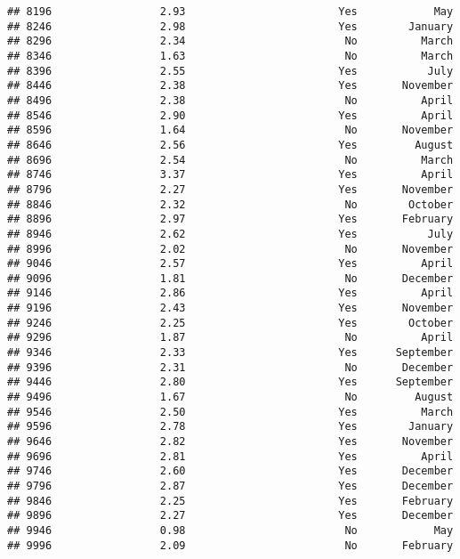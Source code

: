 \documentclass[
]{article}
\begin{document}
\begin{verbatim}
## 8196                 2.93                        Yes            May
## 8246                 2.98                        Yes        January
## 8296                 2.34                         No          March
## 8346                 1.63                         No          March
## 8396                 2.55                        Yes           July
## 8446                 2.38                        Yes       November
## 8496                 2.38                         No          April
## 8546                 2.90                        Yes          April
## 8596                 1.64                         No       November
## 8646                 2.56                        Yes         August
## 8696                 2.54                         No          March
## 8746                 3.37                        Yes          April
## 8796                 2.27                        Yes       November
## 8846                 2.32                         No        October
## 8896                 2.97                        Yes       February
## 8946                 2.62                        Yes           July
## 8996                 2.02                         No       November
## 9046                 2.57                        Yes          April
## 9096                 1.81                         No       December
## 9146                 2.86                        Yes          April
## 9196                 2.43                        Yes       November
## 9246                 2.25                        Yes        October
## 9296                 1.87                         No          April
## 9346                 2.33                        Yes      September
## 9396                 2.31                         No       December
## 9446                 2.80                        Yes      September
## 9496                 1.67                         No         August
## 9546                 2.50                        Yes          March
## 9596                 2.78                        Yes        January
## 9646                 2.82                        Yes       November
## 9696                 2.81                        Yes          April
## 9746                 2.60                        Yes       December
## 9796                 2.87                        Yes       December
## 9846                 2.25                        Yes       February
## 9896                 2.27                        Yes       December
## 9946                 0.98                         No            May
## 9996                 2.09                         No       February

\end{verbatim}
\end{document}

